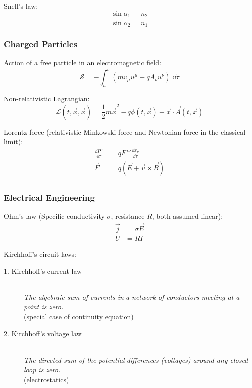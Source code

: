 			\noindent
			Snell's law:
			\begin{equation}
				\frac{\sin\alpha_1}{\sin\alpha_2} = \frac{n_2}{n_1}
			\end{equation}



		\subsubsection{Charged Particles}
			\noindent
			Action of a free particle in an electromagnetic field:
			\begin{equation}
				\mathcal{S}= -\int_{a}^{b}\left(m u_\mu u^\mu + q A_\nu u^\nu\right)\;\dd\tau
			\end{equation}

			\noindent
			Non-relativistic Lagrangian:
			\begin{equation}
				\mathcal{L}(t,\vec{x},\dot{\vec{x}}) = \frac{1}{2}m\dot{\vec{x}}^2 - q\phi(t,\vec{x}) - \dot{\vec{x}}\cdot\vec{A}(t,\vec{x})
			\end{equation}

			\noindent
			Lorentz force (relativistic Minkowski force and Newtonian force in the classical limit):
			\begin{equation}
				\begin{aligned}
					\frac{\dd P^\mu}{\dd \tau} &= q F^{\mu\nu}\frac{\dd x_\nu}{\dd \tau} \\
					\vec{F} &= q\left(\vec{E}+\vec{v}\times\vec{B}\right) \\
				\end{aligned}
			\end{equation}

		\subsubsection{Electrical Engineering}
			\noindent
			Ohm's law (Specific conductivity $\sigma$, resistance $R$, both assumed linear):
			\begin{equation}
				\begin{aligned}
					\vec{j} &= \sigma\vec{E} \\
					U &= R I
				\end{aligned}
			\end{equation}

			\noindent
			Kirchhoff's circuit laws:
			\begin{description}
				\item[1. Kirchhoff's current law] \hfill \\
					{\textit{The algebraic sum of currents in a network of conductors meeting at a point is zero.} \\(special case of continuity equation)}
				\item[2. Kirchhoff's voltage law] \hfill \\
					{\textit{The directed sum of the potential differences (voltages) around any closed loop is zero.} \\(electrostatics)}
			\end{description}

